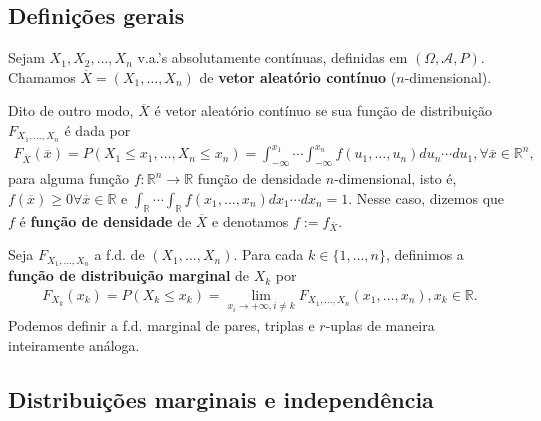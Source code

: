 \documentclass[../Notas.tex]{subfiles}
\begin{document}
\subsection{Definições gerais}
\begin{definition}
Sejam $X_1, X_2, \dots, X_n$ v.a.'s absolutamente contínuas, definidas em $(\Omega, \mathcal{A}, P)$. Chamamos $\overline{X} = (X_1, \dots, X_n)$ de \textbf{vetor aleatório contínuo} ($n$-dimensional).

Dito de outro modo, $\overline{X}$ é vetor aleatório contínuo se sua função de distribuição $F_{X_1, \dots, X_n}$ é dada por
\begin{align*}
    F_{\overline{X}}(\overline{x}) = P(X_1\leq x_1, \dots, X_n\leq x_n) = \int_{-\infty}^{x_1}\cdots\int_{-\infty}^{x_n} f(u_1, \dots, u_n) du_n\cdots du_1, \forall \overline{x}\in\mathbb{R}^n,
\end{align*}
para alguma função $f:\mathbb{R}^n\to\mathbb{R}$ função de densidade $n$-dimensional, isto é, $f(\overline{x}) \geq 0 \forall\overline{x}\in\mathbb{R}$ e $\displaystyle{ \int_{\mathbb{R}} \cdots \int_{\mathbb{R}} f(x_1, \dots, x_n) dx_1\cdots dx_n = 1 }$. Nesse caso, dizemos que $f$ é \textbf{função de densidade} de $\overline{X}$ e denotamos $f:= f_{\overline{X}}$.
\end{definition}

\begin{definition}
Seja $F_{X_1, \dots, X_n}$ a f.d. de $(X_1, \dots, X_n)$. Para cada $k\in\{1,\dots,n\}$, definimos a \textbf{função de distribuição marginal} de $X_k$ por
\begin{align*}
    F_{X_k}(x_k) = P(X_k\leq x_k) = \lim_{x_i\to +\infty, i\neq k} F_{X_1, \dots, X_n}(x_1, \dots, x_n), x_k\in\mathbb{R}.
\end{align*}
Podemos definir a f.d. marginal de pares, triplas e $r$-uplas de maneira inteiramente análoga.
\end{definition}

\subsection{Distribuições marginais e independência}
\end{document}
